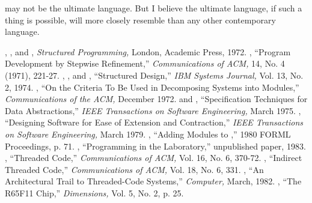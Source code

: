 \Forth{} may not be the ultimate language. But I believe the ultimate
language, if such a thing is possible, will more closely resemble
\Forth{} than any other contemporary language.%


\begin{references}{99}
 , , and ,
\emph{Structured Programming,} London, Academic Press, 1972.
 , ``Program Development by Stepwise
Refinement,'' \emph{Communications of ACM,} 14, No. 4 (1971), 221-27.
 , , and ,
``Structured Design,'' \emph{IBM Systems Journal,} Vol. 13, No. 2, 1974.
 , ``On the Criteria To Be Used in
Decomposing Systems into Modules,'' \emph{Communications of the ACM,}
December 1972.
  and ,
``Specification Techniques for Data Abstractions,'' \emph{IEEE
Transactions on Software Engineering,} March 1975.
 , ``Designing Software for Ease of
Extension and Contraction,'' \emph{IEEE Transactions on Software
Engineering,} March 1979.
 , ``Adding Modules to \Forth{},''
1980 FORML Proceedings, p. 71.
 , ``Programming in the Laboratory,''
  unpublished paper, 1983.
 , ``Threaded Code,'' \emph{Communications
of ACM,} Vol. 16, No. 6, 370-72.
 , ``Indirect Threaded Code,''
\emph{Communications of ACM,} Vol. 18, No. 6, 331.
 , ``An Architectural Trail to
Threaded-Code Systems,'' \emph{Computer,} March, 1982.
 , ``The R65F11 \Forth{} Chip,'' \emph{\Forth{}
Dimensions,} Vol. 5, No. 2, p. 25.
\end{references}

